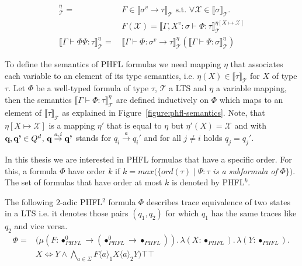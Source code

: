 \begin{figure}
\begin{align*}
        ^\eta_\mathcal{T} =\,& F \in \llbracket \sigma^v \rightarrow \tau \rrbracket_\mathcal{T} \text{ s.t. } \forall
        \mathcal{X} \in \llbracket \sigma \rrbracket_\mathcal{T}.\, \\
        &F(\mathcal{X}) = \llbracket \Gamma, X^v \colon \sigma \vdash \Phi \colon \tau \rrbracket^{\eta[X \mapsto
        \mathcal{X}]}_\mathcal{T}\\
        \llbracket \Gamma \vdash \Phi \Psi \colon \tau \rrbracket^\eta_\mathcal{T} =\,& \llbracket \Gamma \vdash \Phi \colon \sigma
        ^v \rightarrow \tau \rrbracket ^\eta_\mathcal{T}(\llbracket \Gamma \vdash \Psi \colon \sigma \rrbracket ^\eta_\mathcal{T})
    \end{align*}
\end{figure}

To define the semantics of PHFL formulas we need mapping $\eta$ that associates each variable to an element of its
type semantics, i.e. $\eta(X) \in \llbracket\tau\rrbracket_\mathcal{T}$ for $X$ of type $\tau$. Let $\Phi$ be a
well-typed formula of type $\tau$, $\mathcal{T}$ a LTS and $\eta$ a variable mapping, then the semantics
$\llbracket\Gamma \vdash \Phi\colon \tau \rrbracket^\eta_\mathcal{T}$ are defined inductively on $\Phi$ which maps to
an element of $\llbracket\tau\rrbracket_\mathcal{T}$ as explained in Figure~\ref{figure:phfl-semantics}.
Note, that $\eta[X \mapsto \mathcal{X}]$ is a mapping $\eta'$ that is equal to $\eta$ but $\eta'(X) = \mathcal{X}$ and
with $\emph{q}, \emph{q'} \in Q^d$, $\emph{q} \overset{a, i}{\rightarrow} \emph{q'}$ stands for $q_i
\overset{a}{\rightarrow} {q_i}'$ and for all $j \neq i$ holds $q_j = {q_j}'$.

In this thesis we are interested in PHFL formulas that have a specific order. For this, a formula $\Phi$ have order $k$
if $k = max(\{ord(\tau)\mid \Psi \colon \tau$ \textit{is a subformula of} $\Phi\})$. The set of formulas that have
order at most $k$ is denoted by PHFL$^k$.

\begin{example}{\cite{lange2014capturing}}
    \label{example:phfl_order_2}
    The following $2$-adic PHFL$^2$ formula $\Phi$ describes trace equivalence of two states in a LTS i.e. it denotes
    those pairs $(q_1, q_2)$ for which $q_1$ has the same traces like $q_2$ and vice versa.
    \begin{align*}
        \Phi = &(\mu (F \colon \bullet_{PHFL}^0 \rightarrow (\bullet_{PHFL}^0 \rightarrow \bullet_{PHFL})).\,
        \lambda (X \colon \bullet_{PHFL}).\, \lambda (Y \colon \bullet_{PHFL}).\, \\&X \Leftrightarrow Y \wedge
        \underset{a \in \Sigma}{\bigwedge} F \langle a \rangle_1 X \langle a \rangle_2 Y)\top \top
    \end{align*}
\end{example}

